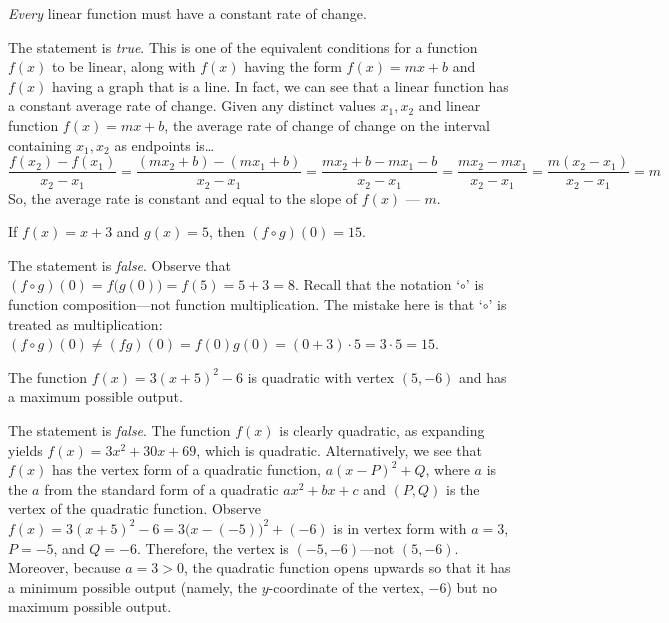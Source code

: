 \documentclass[11pt,letterpaper]{article}
\begin{document}
\thispagestyle{title}

 \textit{Every} linear function must have a constant rate of change. \pspace

\sol The statement is \textit{true}. This is one of the equivalent conditions for a function $f(x)$ to be linear, along with $f(x)$ having the form $f(x)= mx + b$ and $f(x)$ having a graph that is a line. In fact, we can see that a linear function has a constant average rate of change. Given any distinct values $x_1, x_2$ and linear function $f(x)= mx + b$, the average rate of change of change on the interval containing $x_1, x_2$ as endpoints is\dots
	\[
	\dfrac{f(x_2) - f(x_1)}{x_2 - x_1}= \dfrac{(mx_2 + b) - (mx_1 + b)}{x_2 - x_1}= \dfrac{mx_2 + b - mx_1 - b}{x_2 - x_1}= \dfrac{mx_2 - mx_1}{x_2 - x_1}= \dfrac{m(x_2 - x_1)}{x_2 - x_1}= m 
	\]
So, the average rate is constant and equal to the slope of $f(x)$ --- $m$. \par\vspace{1.3cm}



 If $f(x)= x + 3$ and $g(x)= 5$, then $(f \circ g)(0)= 15$. \pspace

\sol The statement is \textit{false}. Observe that $(f \circ g)(0)= f \big( g(0) \big)= f(5)= 5 + 3= 8$. Recall that the notation `$\circ$' is function composition---not function multiplication. The mistake here is that `$\circ$' is treated as multiplication: $(f \circ g)(0) \neq (fg)(0)= f(0) g(0)= (0 + 3) \cdot 5= 3 \cdot 5= 15$. \par\vspace{1.3cm}



 The function $f(x)= 3(x + 5)^2 - 6$ is quadratic with vertex $(5, -6)$ and has a maximum possible output. \pspace

\sol The statement is \textit{false}. The function $f(x)$ is clearly quadratic, as expanding yields $f(x)= 3x^2 + 30x + 69$, which is quadratic. Alternatively, we see that $f(x)$ has the vertex form of a quadratic function, $a(x - P)^2 + Q$, where $a$ is the $a$ from the standard form of a quadratic $ax^2 + bx + c$ and $(P, Q)$ is the vertex of the quadratic function. Observe $f(x)= 3(x + 5)^2 - 6= 3 \big(x - (-5) \big)^2 + (-6)$ is in vertex form with $a= 3$, $P= -5$, and $Q= -6$. Therefore, the vertex is $(-5, -6)$---not $(5, -6)$. Moreover, because $a= 3 > 0$, the quadratic function opens upwards so that it has a minimum possible output (namely, the $y$-coordinate of the vertex, $-6$) but no maximum possible output. \par\vspace{1.3cm}
\end{document}
